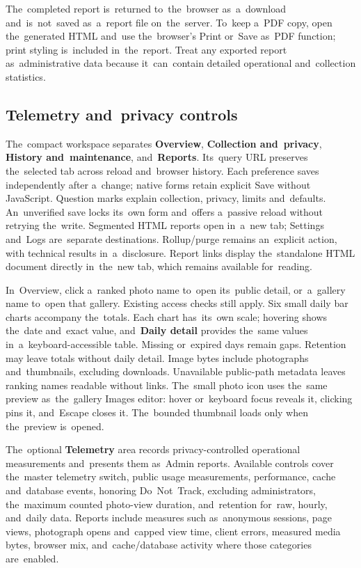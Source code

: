 \documentclass[11pt,a4paper]{article}
\newcommand{\ui}[1]{\textbf{#1}}
\begin{document}
The~completed report is~returned to~the~browser as~a~download and~is~not~saved
as~a~report file on~the~server. To~keep a~PDF copy, open the~generated HTML
and~use the~browser's Print or~Save as~PDF function; print styling is~included
in~the~report. Treat any exported report as~administrative data because
it~can~contain detailed operational and~collection statistics.

\subsection{Telemetry and~privacy controls}

The~compact workspace separates \ui{Overview}, \ui{Collection and~privacy},
\ui{History and~maintenance}, and~\ui{Reports}. Its~query URL preserves
the~selected tab across reload and~browser history. Each preference saves
independently after a~change; native forms retain explicit Save without
JavaScript. Question marks explain collection, privacy, limits and~defaults.
An~unverified save locks its~own form and~offers a~passive reload without
retrying the~write. Segmented HTML reports open in~a~new tab; Settings and~Logs
are~separate destinations. Rollup/purge remains an~explicit action, with
technical results in~a~disclosure.
Report links display the~standalone HTML document directly in~the~new tab,
which remains available for~reading.

In~Overview, click a~ranked photo name to~open its~public detail, or~a~gallery
name to~open that gallery. Existing access checks still apply. Six small daily
bar charts accompany the~totals. Each chart has~its~own scale; hovering shows
the~date and~exact value, and~\ui{Daily detail} provides the~same values
in~a~keyboard-accessible table. Missing or~expired days remain gaps. Retention
may leave totals without daily detail. Image bytes include photographs
and~thumbnails, excluding downloads. Unavailable public-path metadata leaves
ranking names readable without links.
The~small photo icon uses the~same preview as~the~gallery Images editor:
hover or~keyboard focus reveals it, clicking pins it, and~Escape closes it.
The~bounded thumbnail loads only when the~preview is~opened.

The~optional \ui{Telemetry} area records privacy-controlled operational
measurements and~presents them as~Admin reports. Available controls cover
the~master telemetry switch, public usage measurements, performance, cache
and~database events, honoring Do~Not~Track, excluding administrators,
the~maximum counted photo-view duration, and~retention for~raw, hourly,
and~daily data. Reports include measures such as~anonymous sessions, page views,
photograph opens and~capped view time, client errors, measured media bytes,
browser mix, and~cache/database activity where those categories are~enabled.
\end{document}
